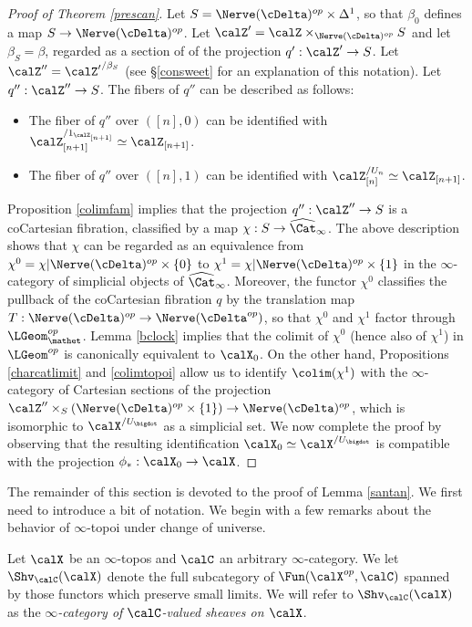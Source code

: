 \begin{proof}[Proof of Theorem \ref{prescan}]
Let $S = \Nerve(\cDelta)^{op} \times \Delta^1$, so that $\beta_0$ defines a map
$S \rightarrow \Nerve(\cDelta)^{op}$. Let $\calZ' = \calZ \times_{ \Nerve(\cDelta)^{op} } S$
and let $\beta_{S} = \beta$, regarded as a section of of the projection $q': \calZ' \rightarrow S$.
Let $\calZ'' = {\calZ'}^{/\beta_S}$ (see \S \ref{consweet} for an explanation of this notation). 
Let $q'': \calZ'' \rightarrow S$. The fibers of $q''$ can be described as follows:
\begin{itemize}
\item The fiber of $q''$ over $([n], 0)$ can be identified with
$\calZ_{[n+1]}^{/ 1_{\calZ_{[n+1]}}} \simeq \calZ_{[n+1]}$.
\item The fiber of $q''$ over $([n], 1)$ can be identified with
$\calZ_{[n]}^{/U_{n}} \simeq \calZ_{[n+1]}$. 
\end{itemize}
Proposition \ref{colimfam} implies that the projection $q'': \calZ'' \rightarrow S$ is a coCartesian fibration, classified by a map $\chi: S \rightarrow \widehat{\Cat}_{\infty}$. The above description
shows that $\chi$ can be regarded as an equivalence from $\chi^0 = \chi | \Nerve(\cDelta)^{op} \times \{0\}$ to $\chi^1 = \chi | \Nerve(\cDelta)^{op} \times \{1\}$ in the $\infty$-category of simplicial objects
of $\widehat{\Cat}_{\infty}$. Moreover, the functor $\chi^0$ classifies the pullback of
the coCartesian fibration $q$ by the translation map $T: \Nerve(\cDelta)^{op} \rightarrow
\Nerve(\cDelta^{op})$, so that $\chi^0$ and $\chi^1$ factor through $\LGeom^{op}_{\mathet}$. 
Lemma \ref{bclock} implies that the colimit of $\chi^0$ (hence also of $\chi^1$) in
$\LGeom^{op}$ is canonically equivalent to $\calX_0$. On the other hand, Propositions \ref{charcatlimit} and \ref{colimtopoi} allow us to identify $\colim( \chi^1)$ with the $\infty$-category
of Cartesian sections of the projection $\calZ'' \times_{ S} ( \Nerve(\cDelta)^{op} \times \{1\} )
\rightarrow \Nerve(\cDelta)^{op}$, which is isomorphic to $\calX^{/U_{\bigdot}}$ as a simplicial set.
We now complete the proof by observing that the resulting identification
$\calX_0 \simeq \calX^{/U_{\bigdot}}$ is compatible with the projection $\phi_{\ast}: \calX_0 \rightarrow \calX$.
\end{proof}

The remainder of this section is devoted to the proof of Lemma \ref{santan}. We first need to introduce a bit of notation. We begin with a few remarks about the behavior of $\infty$-topoi under change of universe.

\begin{notation}
Let $\calX$ be an $\infty$-topos and $\calC$ an arbitrary $\infty$-category. We let
$\Shv_{\calC}(\calX)$ denote the full subcategory of $\Fun( \calX^{op}, \calC)$ spanned by those functors which preserve small limits. We will refer to
$\Shv_{\calC}(\calX)$ as the {\it $\infty$-category of $\calC$-valued sheaves on $\calX$}.
\end{notation}


